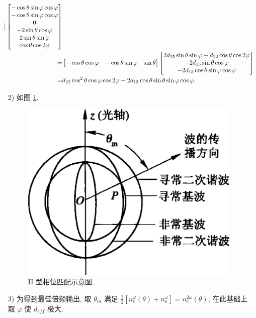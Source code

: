 \documentclass{assignment}
\begin{document}
\begin{sol}
\begin{itemize}
\begin{align}
\begin{bmatrix}
            \end{bmatrix}\begin{bmatrix}
                -\cos\theta\sin\varphi\cos\varphi\\
                -\cos\theta\sin\varphi\cos\varphi\\
                0\\
                -2\sin\theta\cos\varphi\\
                2\sin\theta\sin\varphi\\
                \cos\theta\cos 2\varphi
            \end{bmatrix}\\
            \notag=&\begin{bmatrix}
                -\cos\theta\cos\varphi&-\cos\theta\sin\varphi&\sin\theta
            \end{bmatrix}\begin{bmatrix}
                2d_{15}\sin\theta\sin\varphi-d_{22}\cos\theta\cos 2\varphi\\
                -2d_{15}\sin\theta\cos\varphi\\
                -2d_{13}\cos\theta\sin\varphi\cos\varphi
            \end{bmatrix}\\
            =&d_{22}\cos^2\theta\cos\varphi\cos 2\varphi-2d_{13}\cos\theta\sin\theta\sin\varphi\cos\varphi.
        \end{align}
        \item[2)] 如图 \ref{A1-3}.
        \begin{figure}[H]
            \centering
            \includegraphics[width=.5\columnwidth]{Figures/A1-3.png}
            \caption{II 型相位匹配示意图.}
            \label{A1-3}
        \end{figure}
        \item[3)] 为得到最佳倍频输出, 取 $\theta_m$ 满足 $\frac{1}{2}[n_e^{\omega}(\theta)+n_o^{\omega}]=n_e^{2\omega}(\theta)$, 在此基础上取 $\varphi$ 使 $d_{eff}$ 极大.
    \end{itemize}
\end{sol}
\end{document}

